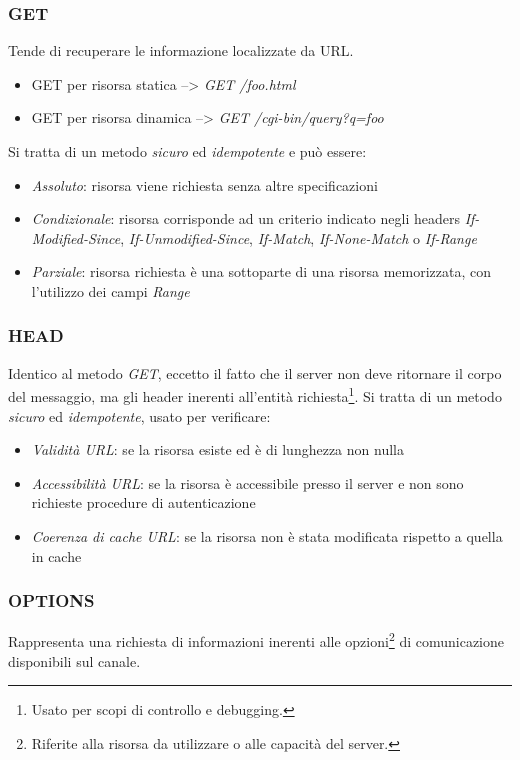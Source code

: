\documentclass[a4paper,11pt]{article}
\begin{document}
\subsubsection{GET}
Tende di recuperare le informazione localizzate da URL.
\begin{itemize}
    \item GET per risorsa statica --> \textit{GET /foo.html}
    \item GET per risorsa dinamica --> \textit{GET /cgi-bin/query?q=foo}
\end{itemize}
Si tratta di un metodo \textit{sicuro} ed \textit{idempotente} e può essere:
\begin{itemize}
    \item \textit{Assoluto}: risorsa viene richiesta senza altre specificazioni
    \item \textit{Condizionale}: risorsa corrisponde ad un criterio indicato negli headers \textit{If-Modified-Since}, \textit{If-Unmodified-Since}, \textit{If-Match}, \textit{If-None-Match} o \textit{If-Range}
    \item \textit{Parziale}: risorsa richiesta è una sottoparte di una risorsa memorizzata, con l’utilizzo dei campi \textit{Range}
\end{itemize}
\subsubsection{HEAD}
Identico al metodo \textit{GET}, eccetto il fatto che il server non deve ritornare il corpo del messaggio, ma gli header inerenti all’entità richiesta\footnote{Usato per scopi di controllo e debugging.}.\newline
Si tratta di un metodo \textit{sicuro} ed \textit{idempotente}, usato per verificare:
\begin{itemize}
    \item \textit{Validità URL}: se la risorsa esiste ed è di lunghezza non nulla
    \item \textit{Accessibilità URL}: se la risorsa è accessibile presso il server e non sono richieste procedure di autenticazione
    \item \textit{Coerenza di cache URL}: se la risorsa non è stata modificata rispetto a quella in cache
\end{itemize}
\subsubsection{OPTIONS}
Rappresenta una richiesta di informazioni inerenti alle opzioni\footnote{Riferite alla risorsa da utilizzare o alle capacità del server.} di comunicazione disponibili sul canale.
\end{document}
